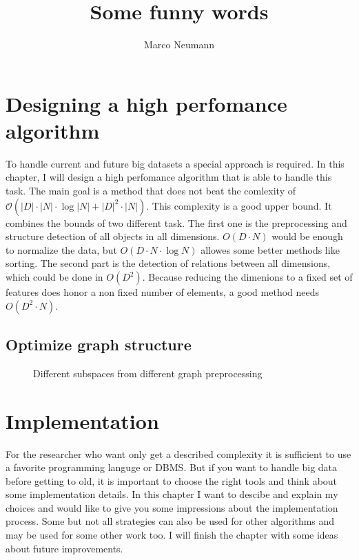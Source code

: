 \documentclass[%
	fontsize=11pt,%
	paper=a4,%
	pagesize,%
	twoside=false,%
	listof=totoc,%
	draft%
]{scrbook}
\title{Some funny words}
\author{Marco Neumann}
\newcommand{\card}[1]{\left|#1\right|}
\begin{document}
\frontmatter
\maketitle
\tableofcontents

\mainmatter
\chapter{Designing a high perfomance algorithm}
To handle current and future big datasets a special approach is required. In this chapter, I will design a high perfomance algorithm that is able to handle this task. The main goal is a method that does not beat the comlexity of $\mathcal{O} ( \card{D} \cdot \card{N} \cdot \log{\card{N}} + \card{D}^2 \cdot \card{N} )$. This complexity is a good upper bound. It combines the bounds of two different task. The first one is the preprocessing and structure detection of all objects in all dimensions. $O\left( D \cdot N \right)$ would be enough to normalize the data, but $O\left( D \cdot N \cdot \log{N} \right)$ allowes some better methods like sorting. The second part is the detection of relations between all dimensions, which could be done in $O\left( D^2 \right)$. Because reducing the dimenions to a fixed set of features does honor a non fixed number of elements, a good method needs $O\left( D^2 \cdot N \right)$.

\section{Optimize graph structure}
\begin{figure}
	\caption{Different subspaces from different graph preprocessing}
	\label{fig:opt_graph}
	\centering
	\hfill
	\hfill
	\subfloat[\label{subfig:opt_graph3}Filtered distance with $\alpha=\frac23$]{}
	\hfill
	\subfloat[\label{subfig:opt_graph4}Bidirectional filtered distance with $\alpha=\frac23$]{}
\end{figure}


\chapter{Implementation}
For the researcher who want only get a described complexity it is sufficient to use a favorite programming languge or DBMS. But if you want to handle big data before getting to old, it is important to choose the right tools and think about some implementation details. In this chapter I want to descibe and explain my choices and would like to give you some impressions about the implementation process. Some but not all strategies can also be used for other algorithms and may be used for some other work too. I will finish the chapter with some ideas about future improvements.
\end{document}
